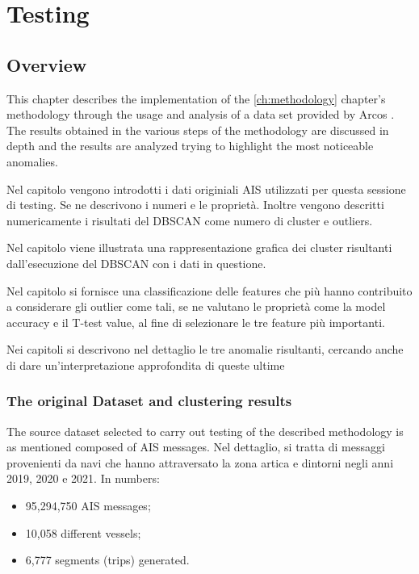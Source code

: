 \chapter{Testing}
\label{ch:testing}

\section{Overview}

This chapter describes the implementation of the \ref{ch:methodology} chapter's methodology through the usage and analysis of a data set provided by Arcos \cite{arcos}. The results obtained in the various steps of the methodology are discussed in depth and the results are analyzed trying to highlight the most noticeable anomalies.

Nel capitolo vengono introdotti i dati originiali AIS utilizzati per questa sessione di testing. Se ne descrivono i numeri e le proprietà. Inoltre vengono descritti numericamente i risultati del DBSCAN come numero di cluster e outliers.

Nel capitolo viene illustrata una rappresentazione grafica dei cluster risultanti dall'esecuzione del DBSCAN con i dati in questione.

Nel capitolo si fornisce una classificazione delle features che più hanno contribuito a considerare gli outlier come tali, se ne valutano le proprietà come la model accuracy e il T-test value, al fine di selezionare le tre feature più importanti.

Nei capitoli si descrivono nel dettaglio le tre anomalie risultanti, cercando anche di dare un'interpretazione approfondita di queste ultime

\clearpage
\subsection{The original Dataset and clustering results}
\label{sec:testing-dataset}
The source dataset selected to carry out testing of the described methodology is as mentioned composed of AIS messages.
Nel dettaglio, si tratta di messaggi provenienti da navi che hanno attraversato la zona artica e dintorni negli anni 2019, 2020 e 2021.
In numbers:
\begin{itemize}
\item 95,294,750 AIS messages;
\item 10,058 different vessels;
\item 6,777 segments (trips) generated.
\end{itemize}


